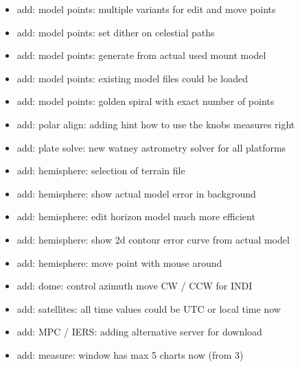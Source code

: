 \documentclass[a4paper,10pt,english]{sphinxmanual}
\begin{document}
\begin{itemize}
\item {} 
\sphinxAtStartPar
add: model points: multiple variants for edit and move points

\item {} 
\sphinxAtStartPar
add: model points: set dither on celestial paths

\item {} 
\sphinxAtStartPar
add: model points: generate from actual used mount model

\item {} 
\sphinxAtStartPar
add: model points: existing model files could be loaded

\item {} 
\sphinxAtStartPar
add: model points: golden spiral with exact number of points

\item {} 
\sphinxAtStartPar
add: polar align: adding hint how to use the knobs measures right

\item {} 
\sphinxAtStartPar
add: plate solve: new watney astrometry solver for all platforms

\item {} 
\sphinxAtStartPar
add: hemisphere: selection of terrain file

\item {} 
\sphinxAtStartPar
add: hemisphere: show actual model error in background

\item {} 
\sphinxAtStartPar
add: hemisphere: edit horizon model much more efficient

\item {} 
\sphinxAtStartPar
add: hemisphere: show 2d contour error curve from actual model

\item {} 
\sphinxAtStartPar
add: hemisphere: move point with mouse around

\item {} 
\sphinxAtStartPar
add: dome: control azimuth move CW / CCW for INDI

\item {} 
\sphinxAtStartPar
add: satellites: all time values could be UTC or local time now

\item {} 
\sphinxAtStartPar
add: MPC / IERS: adding alternative server for download

\item {} 
\sphinxAtStartPar
add: measure: window has max 5 charts now (from 3)


\end{itemize}
\end{document}

